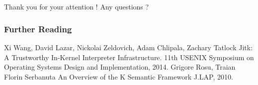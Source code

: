 \documentclass{beamer}
\begin{document}
\section{}
\begin{frame}
Thank you for your attention ! Any questions ?
\end{frame}
\begin{frame}[allowframebreaks]
  \frametitle<presentation>{Further Reading}    
  \begin{thebibliography}{10}    
  \beamertemplatearticlebibitems
  \bibitem{}
    Xi Wang, David Lazar, Nickolai Zeldovich, Adam Chlipala, Zachary Tatlock
    \newblock Jitk: A Trustworthy In-Kernel Interpreter Infrastructure.
    \newblock 11th USENIX Symposium on Operating Systems Design and Implementation, 2014.
  \beamertemplatearticlebibitems
  \bibitem{}
    Grigore Rosu, Traian Florin Serbanuta
    \newblock An Overview of the K Semantic Framework
    \newblock J.LAP, 2010.
  \end{thebibliography}
\end{frame}
\end{document}
